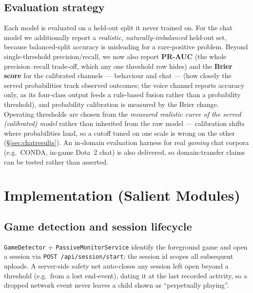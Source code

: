 \documentclass[11pt,a4paper]{article}
\begin{document}
\subsection{Evaluation strategy}
Each model is evaluated on a held-out split it never trained on. For the chat model
we additionally report a \emph{realistic, naturally-imbalanced} held-out set, because
balanced-split accuracy is misleading for a rare-positive problem. Beyond
single-threshold precision/recall, we now also report \textbf{PR-AUC} (the whole
precision--recall trade-off, which any one threshold row hides) and the \textbf{Brier
score} for the calibrated channels --- behaviour and chat --- (how closely the served
probabilities track observed outcomes; the voice channel reports accuracy only, as its four-class output
feeds a rule-based fusion rather than a probability threshold), and probability
calibration is measured by the Brier change. Operating thresholds are chosen from the
\emph{measured realistic curve of the served (calibrated) model} rather than inherited
from the raw model --- calibration shifts where probabilities land, so a cutoff tuned
on one scale is wrong on the other (\S\ref{sec:chatresults}). An in-domain evaluation
harness for real \emph{gaming} chat corpora (e.g.\ CONDA, in-game Dota~2 chat) is also
delivered, so domain-transfer claims can be tested rather than asserted.

\section{Implementation (Salient Modules)}
\subsection{Game detection and session lifecycle}
\texttt{GameDetector} + \texttt{PassiveMonitorService} identify the foreground game
and open a session via \texttt{POST /api/session/start}; the session id scopes all
subsequent uploads. A server-side safety net auto-closes any session left open
beyond a threshold (e.g.\ from a lost end-event), dating it at the last recorded
activity, so a dropped network event never leaves a child shown as ``perpetually
playing''.
\end{document}
